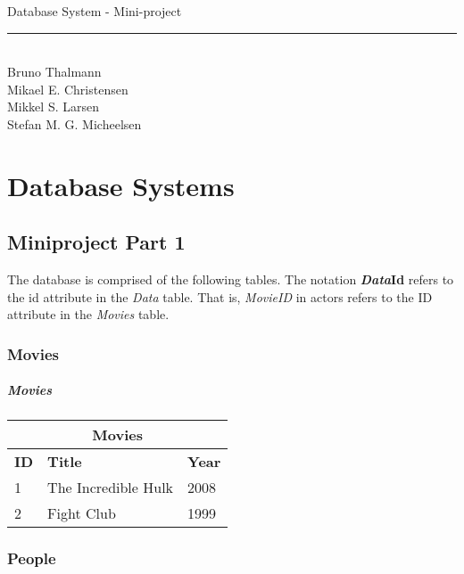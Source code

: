 
\newcommand{\HRule}{\rule{\linewidth}{0.5mm}}


\begin{titlepage}
\centering
{\LARGE Database System - Mini-project}
\HRule \\[0.5cm]
Bruno Thalmann\\
			Mikael E. Christensen\\
			Mikkel S. Larsen\\
			Stefan M. G. Micheelsen
\end{titlepage}

\chapter*{Database Systems}

\section{Miniproject Part 1}
The database is comprised of the following tables.
The notation \textbf{\textit{Data}Id} refers to the id attribute in the \textit{Data} table.
That is, \textit{MovieID} in actors refers to the ID attribute in the \textit{Movies} table.

\subsection{Movies}

\paragraph{Movies}
\begin{center}
\begin{tabular}{|l|l|l|}
\hline
\multicolumn{3}{|c|}{Movies} \\ \hline \hline
\textbf{ID} & \textbf{Title} & \textbf{Year} \\ \hline \hline
1 & The Incredible Hulk & 2008 \\ \hline
2 & Fight Club & 1999 \\ \hline
\end{tabular}
\end{center}

\subsection{People}

